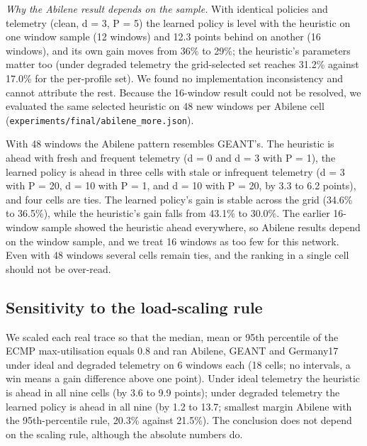 \documentclass[journal]{IEEEtran}
\begin{document}
\textit{Why the Abilene result depends on the sample.} With identical policies and telemetry (clean, d = 3, P = 5) the learned policy is level with the heuristic on one window sample (12 windows) and 12.3 points behind on another (16 windows), and its own gain moves from 36\% to 29\%; the heuristic's parameters matter too (under degraded telemetry the grid-selected set reaches 31.2\% against 17.0\% for the per-profile set). We found no implementation inconsistency and cannot attribute the rest. Because the 16-window result could not be resolved, we evaluated the same selected heuristic on 48 new windows per Abilene cell (\texttt{experiments/final/abilene\_more.json}).

With 48 windows the Abilene pattern resembles GEANT's. The heuristic is ahead with fresh and frequent telemetry (d = 0 and d = 3 with P = 1), the learned policy is ahead in three cells with stale or infrequent telemetry (d = 3 with P = 20, d = 10 with P = 1, and d = 10 with P = 20, by 3.3 to 6.2 points), and four cells are ties. The learned policy's gain is stable across the grid (34.6\% to 36.5\%), while the heuristic's gain falls from 43.1\% to 30.0\%. The earlier 16-window sample showed the heuristic ahead everywhere, so Abilene results depend on the window sample, and we treat 16 windows as too few for this network. Even with 48 windows several cells remain ties, and the ranking in a single cell should not be over-read.

\subsection{Sensitivity to the load-scaling rule}
\label{sec:6.2b}
We scaled each real trace so that the median, mean or 95th percentile of the ECMP max-utilisation equals 0.8 and ran Abilene, GEANT and Germany17 under ideal and degraded telemetry on 6 windows each (18 cells; no intervals, a win means a gain difference above one point). Under ideal telemetry the heuristic is ahead in all nine cells (by 3.6 to 9.9 points); under degraded telemetry the learned policy is ahead in all nine (by 1.2 to 13.7; smallest margin Abilene with the 95th-percentile rule, 20.3\% against 21.5\%). The conclusion does not depend on the scaling rule, although the absolute numbers do.
\end{document}
